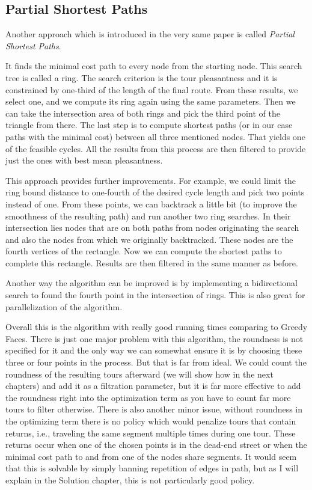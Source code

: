 \documentclass{ctuthesis}
\begin{document}
\subsection{Partial Shortest Paths}
Another approach which is introduced in the very same paper is called \textit{Partial Shortest Paths}.\cite{jogging} \par 
It finds the minimal cost path to every node from the starting node. This search tree is called a ring. The search criterion is the tour pleasantness and it is constrained by one-third of the length of the final route. From these results, we select one, and we compute its ring again using the same parameters. Then we can take the intersection area of both rings and pick the third point of the triangle from there. The last step is to compute shortest paths (or in our case paths with the minimal cost) between all three mentioned nodes. That yields one of the feasible cycles. All the results from this process are then filtered to provide just the ones with best mean pleasantness. \par
This approach provides further improvements. For example, we could limit the ring bound distance to one-fourth of the desired cycle length and pick two points instead of one. From these points, we can backtrack a little bit (to improve the smoothness of the resulting path) and run another two ring searches. In their intersection lies nodes that are on both paths from nodes originating the search and also the nodes from which we originally backtracked. These nodes are the fourth vertices of the rectangle. Now we can compute the shortest paths to complete this rectangle. Results are then filtered in the same manner as before. \par 
Another way the algorithm can be improved is by implementing a bidirectional search to found the fourth point in the intersection of rings. This is also great for parallelization of the algorithm. \par 
Overall this is the algorithm with really good running times comparing to Greedy Faces. There is just one major problem with this algorithm, the roundness is not specified for it and the only way we can somewhat ensure it is by choosing these three or four points in the process. But that is far from ideal. We could count the roundness of the resulting tours afterward (we will show how in the next chapters) and add it as a filtration parameter, but it is far more effective to add the roundness right into the optimization term as you have to count far more tours to filter otherwise. There is also another minor issue, without roundness in the optimizing term there is no policy which would penalize tours that contain returns, i.e., traveling the same segment multiple times during one tour. These returns occur when one of the chosen points is in the dead-end street or when the minimal cost path to and from one of the nodes share segments. It would seem that this is solvable by simply banning repetition of edges in path, but as I will explain in the Solution chapter, this is not particularly good policy.
\end{document}
